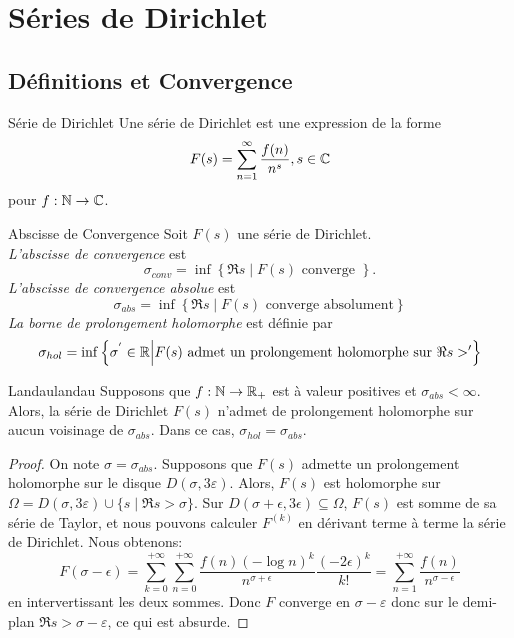 \documentclass{cours}
\begin{document}
\section{Séries de Dirichlet}
\subsection{Définitions et Convergence}
\begin{définition}
	{Série de Dirichlet}{}
	Une série de Dirichlet est une expression de la forme 
	\begin{equation*}
		F(s) = \sum_{n = 1}^{\infty} \frac{f(n)}{n^{s}}, s\in \mathbb{C}
	\end{equation*}
	pour $f : \mathbb{N} \to \mathbb{C}$. 
\end{définition}

\begin{définition}
	{Abscisse de Convergence}{}
	Soit $F(s)$ une série de Dirichlet. \\
	\emph{L'abscisse de convergence} est 
	\begin{equation*}
		\sigma_{conv} = \inf \left\{\Re s \middle| F(s) \text{ converge }\right\}.
	\end{equation*}
	\emph{L'abscisse de convergence absolue} est 
	\begin{equation*}
		\sigma_{abs} = \inf \left\{\Re s\middle| F(s) \text{ converge absolument} \right\}
	\end{equation*}
	\emph{La borne de prolongement holomorphe} est définie par 
	\begin{equation*}
		\sigma_{hol} = \inf \left\{\sigma^{'}\in \mathbb{R}\middle| F(s) \text{ admet un prolongement holomorphe sur } \Re s >'\right\}
	\end{equation*}

\end{définition}
\begin{théorème}
	{Landau}{landau}
	Supposons que $f : \mathbb{N} \to \mathbb{R}_{+}$ est à valeur positives et $\sigma_{abs} < \infty$. Alors, la série de Dirichlet $F(s)$ n'admet de prolongement holomorphe sur aucun voisinage de $\sigma_{abs}$. Dans ce cas, $\sigma_{hol} = \sigma_{abs}$. 
\end{théorème}
\begin{proof}
	On note $\sigma = \sigma_{abs}$. Supposons que $F(s)$ admette un prolongement holomorphe sur le disque $D(\sigma, 3\varepsilon)$. Alors, $F(s)$ est holomorphe sur $\Omega = D(\sigma, 3\varepsilon) \cup \{s \mid \Re s > \sigma\}$. Sur $D(\sigma + \epsilon, 3\epsilon) \subseteq \Omega$, $F(s)$ est somme de sa série de Taylor, et nous pouvons calculer $F^{(k)}$ en dérivant terme à terme la série de Dirichlet. Nous obtenons: 
	\begin{equation*}
		F(\sigma - \epsilon) = \sum_{k = 0}^{+ \infty}\sum_{n = 0}^{+\infty}\frac{f(n) (-\log n)^{k}}{n^{\sigma + \epsilon}}\frac{(-2\epsilon)^{k}}{k!} = \sum_{n = 1}^{+ \infty} \frac{f(n)}{n^{\sigma - \epsilon}}
	\end{equation*}
	en intervertissant les deux sommes. 
	Donc $F$ converge en $\sigma -  \varepsilon$ donc sur le demi-plan $\Re s > \sigma - \varepsilon$, ce qui est absurde. 
\end{proof}
\end{document}

